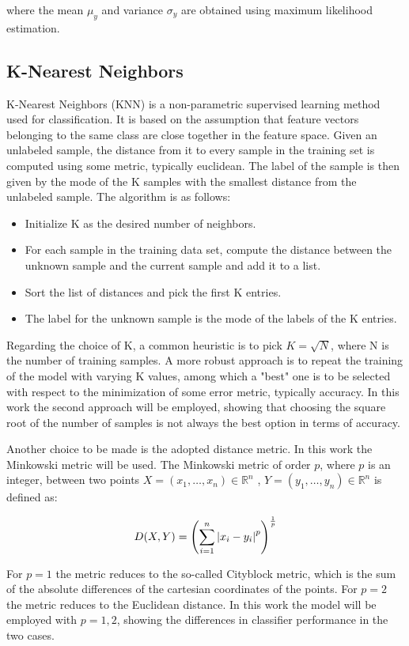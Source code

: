 \documentclass[journal,twocolumn]{IEEEtran}
\begin{document}
where the mean $\mu_y$ and variance $\sigma_y$ are obtained using maximum likelihood estimation.

\subsection{K-Nearest Neighbors}

K-Nearest Neighbors (KNN) is a non-parametric supervised learning method used for classification. It is based on the assumption that feature vectors belonging to the same class are close
together in the feature space. Given an unlabeled sample,
the distance from it to every sample in the training set is
computed using some metric, typically euclidean. The label
of the sample is then given by the mode of the K samples
with the smallest distance from the unlabeled sample. The
algorithm is as follows:
\begin{itemize}
\item Initialize K as the desired number of neighbors.
\item For each sample in the training data set, compute the
distance between the unknown sample and the current
sample and add it to a list.
\item Sort the list of distances and pick the first K entries.
\item The label for the unknown sample is the mode of the
labels of the K entries.
\end{itemize}
Regarding
the choice of K, a common heuristic is to pick $K=\sqrt{N}$, where N is the number of training samples. A more robust approach is to repeat the training of the model
with varying K values, among which a "best" one is to be
selected with respect to the minimization of some error metric, typically accuracy. In this work the second approach will be employed, showing that choosing the square root of the number of samples is not always the best option in terms of accuracy.

Another choice to be made is the adopted distance metric. In
this work the Minkowski metric will be used. The Minkowski
metric of order $p$, where $p$ is an integer, between two points $X=(x_1,\dots,x_n)\in\mathbb{R}^n$ , $Y=(y_1,\dots,y_n) \in\mathbb{R}^n$ is defined
as:

\begin{equation*}
D(X,Y)=\left(\sum\limits_{i=1}^n\abs{x_i-y_i}^p\right)^{\frac{1}{p}}
\end{equation*}

For $p=1$ the metric reduces to the so-called Cityblock metric, which is the sum of the absolute differences of the cartesian coordinates of the points. For $p=2$ the metric reduces to the Euclidean distance. In this work the model will be employed with $p=1,2$, showing the differences in classifier performance in the two cases.
\end{document}
